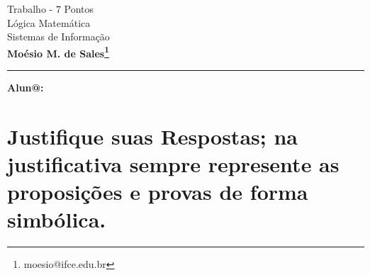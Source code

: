 \documentclass[11pt,a4paper]{article}
\title{\titu}
\author{\nome}
\date{\today}
\makeatletter
\newcommand{\nome}{\bf Mo\'esio M. de Sales\footnote{moesio@ifce.edu.br}}
\newcommand{\titu}{Trabalho - \texorpdfstring{$7$}{} Pontos}
\newcommand{\disc}{Lógica Matemática}
\newcommand{\curso}{Sistemas de Informação}
\makeatother
\begin{document}
{\Large
\begin{center} \titu\\ \disc\\ \curso\\ \nome\end{center}
}
\hrule
\noindent
{\bf Alun@:}\hrulefill\

\section{\sc Justifique suas Respostas; na justificativa sempre represente as proposições e provas de forma simbólica.}
\exerc{%












}
\end{document}
